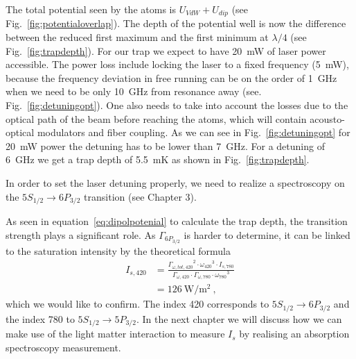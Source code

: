The total potential seen by the atoms is \(U_{VdW} + U_{dip} \) 
(see Fig.~\ref{fig:potentialoverlap}). The depth of the potential well is now the 
difference between the reduced first maximum and the first minimum at \(\lambda/4 \)
(see Fig.~\ref{fig:trapdepth}). 
For our trap we expect to have \SI{20}{\milli\watt} of laser power accessible. 
The power loss include locking the laser to a fixed frequency (\SI{5}{\milli\watt}), 
because the frequency deviation in free running can be on the order of 
\SI{1}{\giga\hertz} when we need to be only \SI{10}{\giga\hertz} from resonance 
away (see. Fig.~\ref{fig:detuningopt}). One also needs to take into account the 
losses due to the optical path of the beam before reaching the atoms, which will 
contain acousto-optical modulators and fiber coupling. As we can see in 
Fig.~\ref{fig:detuningopt} for \SI{20}{\milli\watt} power the detuning has to be 
lower than \SI{7}{\giga\hertz}. For a detuning of \SI{6}{\giga\hertz} we get a trap 
depth of \SI{5.5}{\milli\kelvin} as shown in Fig.~\ref{fig:trapdepth}.

In order to set the laser detuning properly, we need to realize a spectroscopy 
on the \(5S_{1/2} \rightarrow 6P_{3/2} \) transition (see Chapter 3).

As seen in equation~\ref{eq:dipolpotenial} to calculate the trap depth, the 
transition strength plays a significant role. As \(\Gamma_{6P_{3/2}}\) is harder
to determine, it can be linked to the saturation intensity by the theoretical
formula
\begin{align}
    I_{s,420} &= \frac{{\Gamma_{\omega,tot,420}}^2\cdot{\omega_{420}}^3\cdot I_{s,780}}
    {\Gamma_{\omega,420}\cdot\Gamma_{\omega,780}\cdot{\omega_{780}}^3} \\
    &= \SI{126}{\watt\per\meter\squared}~,
\end{align} 
which we would like to confirm. The index 420 corresponds to 
\(5S_{1/2} \rightarrow 6P_{3/2} \) and the index 780 to 
\(5S_{1/2} \rightarrow 5P_{3/2} \). In the next chapter we will discuss how we 
can make use of the light matter interaction to measure \(I_s\) by realising an 
absorption spectroscopy measurement.

